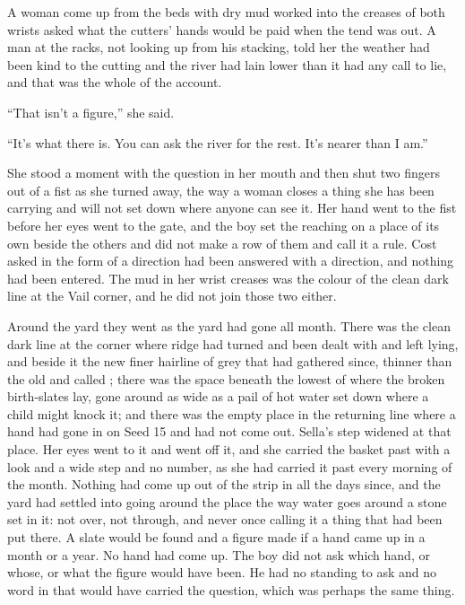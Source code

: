 A woman come up from the beds with dry mud worked into the creases of both wrists asked what the cutters' hands would be paid when the tend was out. A man at the racks, not looking up from his stacking, told her the weather had been kind to the cutting and the river had lain lower than it had any call to lie, and that was the whole of the account.

“That isn't a figure,” she said.

“It's what there is. You can ask the river for the rest. It's nearer than I am.”

She stood a moment with the question in her mouth and then shut two fingers out of a fist as she turned away, the way a woman closes a thing she has been carrying and will not set down where anyone can see it. Her hand went to the fist before her eyes went to the gate, and the boy set the reaching on a place of its own beside the others and did not make a row of them and call it a rule. Cost asked in the form of a direction had been answered with a direction, and nothing had been entered. The mud in her wrist creases was the colour of the clean dark line at the Vail corner, and he did not join those two either.

Around the yard they went as the yard had gone all month. There was the clean dark line at the corner where  ridge had turned and been dealt with and left lying, and beside it the new finer hairline of grey that had gathered since, thinner than the old and called ; there was the space beneath the lowest of  where the broken birth-slates lay, gone around as wide as a pail of hot water set down where a child might knock it; and there was the empty place in the returning line where a hand had gone in on Seed 15 and had not come out. Sella's step widened at that place. Her eyes went to it and went off it, and she carried the basket past with a look and a wide step and no number, as she had carried it past every morning of the month. Nothing had come up out of the strip in all the days since, and the yard had settled into going around the place the way water goes around a stone set in it: not over, not through, and never once calling it a thing that had been put there. A slate would be found and a figure made if a hand came up in a month or a year. No hand had come up. The boy did not ask which hand, or whose, or what the figure would have been. He had no standing to ask and no word in  that would have carried the question, which was perhaps the same thing.

